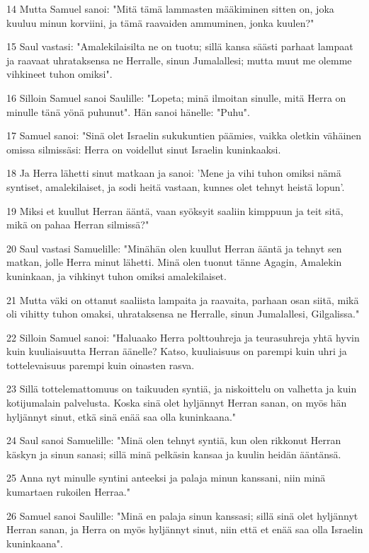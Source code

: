 \par 14 Mutta Samuel sanoi: "Mitä tämä lammasten määkiminen sitten on, joka kuuluu minun korviini, ja tämä raavaiden ammuminen, jonka kuulen?"
\par 15 Saul vastasi: "Amalekilaisilta ne on tuotu; sillä kansa säästi parhaat lampaat ja raavaat uhrataksensa ne Herralle, sinun Jumalallesi; mutta muut me olemme vihkineet tuhon omiksi".
\par 16 Silloin Samuel sanoi Saulille: "Lopeta; minä ilmoitan sinulle, mitä Herra on minulle tänä yönä puhunut". Hän sanoi hänelle: "Puhu".
\par 17 Samuel sanoi: "Sinä olet Israelin sukukuntien päämies, vaikka oletkin vähäinen omissa silmissäsi: Herra on voidellut sinut Israelin kuninkaaksi.
\par 18 Ja Herra lähetti sinut matkaan ja sanoi: 'Mene ja vihi tuhon omiksi nämä syntiset, amalekilaiset, ja sodi heitä vastaan, kunnes olet tehnyt heistä lopun'.
\par 19 Miksi et kuullut Herran ääntä, vaan syöksyit saaliin kimppuun ja teit sitä, mikä on pahaa Herran silmissä?"
\par 20 Saul vastasi Samuelille: "Minähän olen kuullut Herran ääntä ja tehnyt sen matkan, jolle Herra minut lähetti. Minä olen tuonut tänne Agagin, Amalekin kuninkaan, ja vihkinyt tuhon omiksi amalekilaiset.
\par 21 Mutta väki on ottanut saaliista lampaita ja raavaita, parhaan osan siitä, mikä oli vihitty tuhon omaksi, uhrataksensa ne Herralle, sinun Jumalallesi, Gilgalissa."
\par 22 Silloin Samuel sanoi: "Haluaako Herra polttouhreja ja teurasuhreja yhtä hyvin kuin kuuliaisuutta Herran äänelle? Katso, kuuliaisuus on parempi kuin uhri ja tottelevaisuus parempi kuin oinasten rasva.
\par 23 Sillä tottelemattomuus on taikuuden syntiä, ja niskoittelu on valhetta ja kuin kotijumalain palvelusta. Koska sinä olet hyljännyt Herran sanan, on myös hän hyljännyt sinut, etkä sinä enää saa olla kuninkaana."
\par 24 Saul sanoi Samuelille: "Minä olen tehnyt syntiä, kun olen rikkonut Herran käskyn ja sinun sanasi; sillä minä pelkäsin kansaa ja kuulin heidän ääntänsä.
\par 25 Anna nyt minulle syntini anteeksi ja palaja minun kanssani, niin minä kumartaen rukoilen Herraa."
\par 26 Samuel sanoi Saulille: "Minä en palaja sinun kanssasi; sillä sinä olet hyljännyt Herran sanan, ja Herra on myös hyljännyt sinut, niin että et enää saa olla Israelin kuninkaana".
